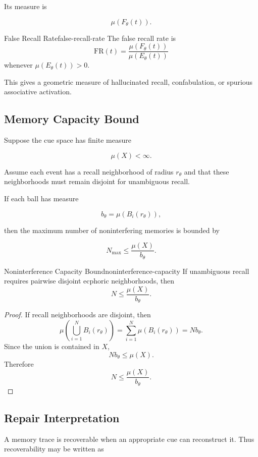 \documentclass[12pt,twoside,openright]{book}
\begin{document}
Its measure is

\[
\mu(F_\theta(t)).
\]

\begin{definition}{False Recall Rate}{false-recall-rate}
  The false recall rate is
  \[
    \mathrm{FR}(t)
=
    \frac{\mu(F_\theta(t))}
    {\mu(E_\theta(t))}
  \]
  whenever \(\mu(E_\theta(t))>0\).
\end{definition}

This gives a geometric measure of hallucinated recall,
confabulation, or spurious associative activation.

\subsection{Memory Capacity Bound}

Suppose the cue space has finite measure

\[
\mu(X)<\infty.
\]

Assume each event has a recall neighborhood of radius
\(r_\theta\) and that these neighborhoods must remain
disjoint for unambiguous recall.

If each ball has measure

\[
b_\theta=\mu(B_i(r_\theta)),
\]

then the maximum number of noninterfering memories is
bounded by

\[
N_{\max}
\le
\frac{\mu(X)}{b_\theta}.
\]

\begin{theorem}{Noninterference Capacity Bound}{noninterference-capacity}
  If unambiguous recall requires pairwise disjoint
  ecphoric neighborhoods, then
  \[
    N
    \le
    \frac{\mu(X)}{b_\theta}.
  \]
\end{theorem}

\begin{proof}
  If recall neighborhoods are disjoint, then
  \[
    \mu\left(\bigcup_{i=1}^N B_i(r_\theta)\right)
=
    \sum_{i=1}^N \mu(B_i(r_\theta))
=
    Nb_\theta.
  \]
  Since the union is contained in \(X\),
  \[
    Nb_\theta\le\mu(X).
  \]
  Therefore
  \[
    N\le\frac{\mu(X)}{b_\theta}.
  \]
\end{proof}

\subsection{Repair Interpretation}

A memory trace is recoverable when an appropriate cue can
reconstruct it. Thus recoverability may be written as
\end{document}
